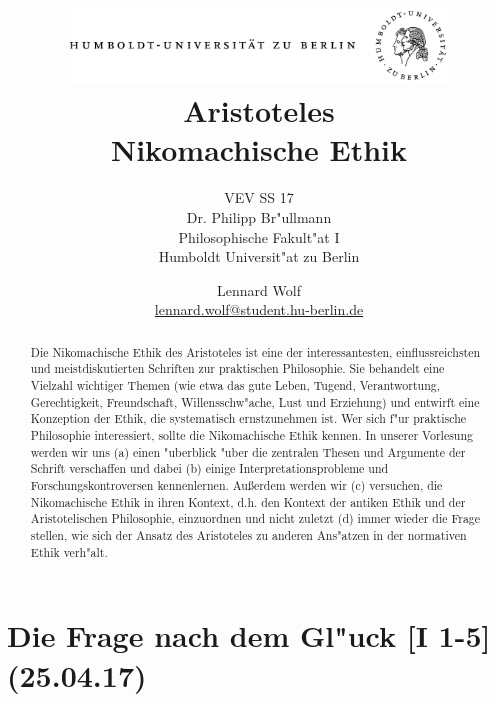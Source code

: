 \documentclass[emulatestandardclasses]{scrartcl}
\date{\vspace{-3ex}}
\begin{document}
\title{
	\includegraphics*[width=0.75\textwidth]{ErstesSem/images/hu_logo.png}\\
	\vspace{24pt}
	Aristoteles\\Nikomachische Ethik}
\subtitle{VEV SS 17\\
          Dr. Philipp Br"ullmann\\
          Philosophische Fakult"at I \\ 
          Humboldt Universit"at zu Berlin}
\author{Lennard Wolf\\
        \small{\href{mailto:lennard.wolf@student.hu-berlin.de}{lennard.wolf@student.hu-berlin.de}}}
\maketitle
\begin{abstract}

Die Nikomachische Ethik des Aristoteles ist eine der interessantesten, einflussreichsten und meistdiskutierten Schriften zur praktischen Philosophie. Sie behandelt eine Vielzahl wichtiger Themen (wie etwa das gute Leben, Tugend, Verantwortung, Gerechtigkeit, Freundschaft, Willensschw"ache, Lust und Erziehung) und entwirft eine Konzeption der Ethik, die systematisch ernstzunehmen ist. Wer sich f"ur praktische Philosophie interessiert, sollte die Nikomachische Ethik kennen. In unserer Vorlesung werden wir uns (a) einen "uberblick "uber die zentralen Thesen und Argumente der Schrift verschaffen und dabei (b) einige Interpretationsprobleme und Forschungskontroversen kennenlernen. Außerdem werden wir (c) versuchen, die Nikomachische Ethik in ihren Kontext, d.h. den Kontext der antiken Ethik und der Aristotelischen Philosophie, einzuordnen und nicht zuletzt (d) immer wieder die Frage stellen, wie sich der Ansatz des Aristoteles zu anderen Ans"atzen in der normativen Ethik verh"alt.
\end{abstract}
\newpage

\tableofcontents
\listoffigures
\newpage


\section{Die Frage nach dem Gl"uck [I 1-5]\\(25.04.17)}
\end{document}
